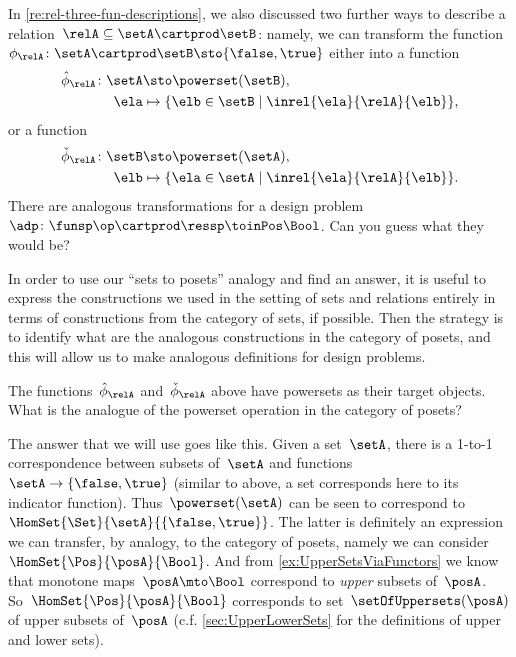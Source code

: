 In \cref{re:rel-three-fun-descriptions}, we also discussed two further ways to describe a relation~$\relA \subseteq \setA \cartprod \setB$: namely, we can transform the function~$\phi_{\relA}\colon \setA \cartprod\setB \sto \{ \false, \true \}$ either into a function
\begin{equation}
	\label{eq:curried-relation-again}
	\begin{aligned}
		\hat \phi_{\relA} \colon \setA & \sto \powerset (\setB)                                       , \\
		\ela                           & \mapsto \{ \elb \in \setB \mid \inrel{\ela}{\relA}{\elb} \},
	\end{aligned}
\end{equation}
or a function
\begin{equation}
	\label{eq:co-curried-relation-again}
	\begin{aligned}
		\check \phi_{\relA} \colon \setB & \sto \powerset (\setA)                                      , \\
		\elb                             & \mapsto \{ \ela \in \setA \mid \inrel{\ela}{\relA}{\elb}\}.
	\end{aligned}
\end{equation}
%
There are analogous transformations for a design problem~$\adp\colon \funsp\op \cartprod \ressp\toinPos \Bool$.
Can you guess what they would be?

In order to use our ``sets to posets'' analogy and find an answer, it is useful to express the constructions we used in the setting of sets and relations entirely in terms of constructions from the category of sets, if possible.
Then the strategy is to identify what are the analogous constructions in the category of posets, and this will allow us to make analogous definitions for design problems.

The functions~$\hat \phi_{\relA}$ and~$\check \phi_{\relA}$ above have powersets as their target objects.
What is the analogue of the powerset operation in the category of posets?

The answer that we will use goes like this.
Given a set~$\setA$, there is a 1-to-1 correspondence between subsets of~$\setA$ and functions~$\setA \to \{ \false, \true \}$ (similar to above, a set corresponds here to its indicator function).
Thus~$\powerset (\setA)$ can be seen to correspond to~$\HomSet{\Set}{\setA}{\{ \false, \true\}}$.
The latter is definitely an expression we can transfer, by analogy, to the category of posets, namely we can consider~$\HomSet{\Pos}{\posA}{\Bool}$.
And from \cref{ex:UpperSetsViaFunctors} we know that monotone maps~$\posA \mto \Bool$ correspond to \emph{upper} subsets of~$\posA$.
So~$\HomSet{\Pos}{\posA}{\Bool}$ corresponds to set~$\setOfUppersets (\posA)$ of upper subsets of~$\posA$ (c.f.
\cref{sec:UpperLowerSets} for the definitions of upper and lower sets).

